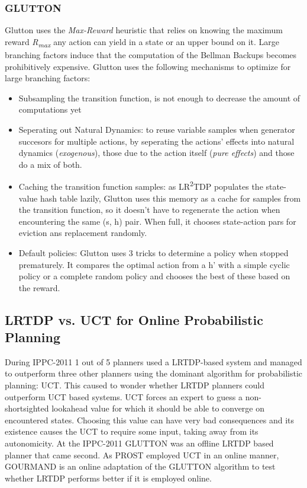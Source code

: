 \documentclass[runningheads,a4paper]{llncs}
\begin{document}
\subsubsection{GLUTTON}
Glutton uses the \emph{Max-Reward} heuristic that relies on knowing the maximum reward \emph{R\textsubscript{max}} any action can yield in a state or an upper bound on it. Large branching factors induce that the computation of the Bellman Backups becomes prohibitively expensive. Glutton uses the following mechanisms to optimize for large branching factors:
\begin{itemize}
	\item Subsampling the transition function, is not enough to decrease the amount of computations yet
	\item Seperating out Natural Dynamics: to reuse variable samples when generator succesors for multiple actions, by seperating the actions' effects into natural dynamics (\emph{exogenous}), those due to the action itself (\emph{pure effects}) and those do a mix of both. 
	\item Caching the transition function samples: as LR\textsuperscript{2}TDP populates the state-value hash table lazily, Glutton uses  this memory as a cache for samples from the transition function, so it doesn't have to regenerate the action when encountering the same (s, h) pair. When full, it chooses state-action pars for eviction ans replacement randomly. 
	\item Default policies: Glutton uses 3 tricks to determine a policy when stopped prematurely. It compares the optimal action from a h' with a simple cyclic policy or a complete random policy and chooses the best of these based on the reward.  
\end{itemize}


\subsection{LRTDP vs. UCT for Online Probabilistic Planning\cite{kolobov2012gourmand}}
During IPPC-2011 1 out of 5 planners used a LRTDP-based system and managed to outperform three other planners using the dominant algorithm for probabilistic planning: UCT. This caused to wonder whether LRTDP planners could outperform UCT based systems.  UCT forces an expert to guess a non-shortsighted lookahead value for which it should be able to converge on encountered states. Choosing this value can have very bad consequences and its existence causes the UCT to require some input, taking away from its autonomicity. At the IPPC-2011 GLUTTON was an offline LRTDP based planner that came second. As PROST employed UCT in an online manner, GOURMAND is an online adaptation of the GLUTTON algorithm to test whether LRTDP performs better if it is employed online. 
\end{document}
